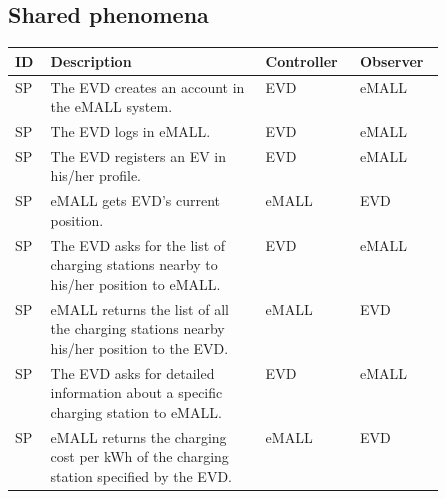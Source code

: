 \subsection{Shared phenomena}
\label{subsec:shared_phenomena}%
\setcounter{sp}{1}
\newcommand{\csp} {\thesp\stepcounter{sp}}
\begin{center}
    \begin{longtable}{ |l|p{0.5\linewidth}|l|l| }
        \hline
        \textbf{ID} & \textbf{Description}                                                                                                          & \textbf{Controller} & \textbf{Observer} \\
        \hline
        SP\csp      & The EVD creates an account in the eMALL system.\                                                                               & EVD                 & eMALL             \\
        \hline
        SP\csp      & The EVD logs in eMALL.                                                                                                        & EVD                 & eMALL             \\
        \hline
        SP\csp      & The EVD registers an EV in his/her profile.\                                                                                   & EVD                 & eMALL             \\
        \hline
        SP\csp      & eMALL gets EVD's current position.\                                                                                            & eMALL               & EVD               \\
        \hline
        SP\csp      & The EVD asks for the list of charging stations nearby to his/her position to eMALL.                                            & EVD                 & eMALL             \\
        \hline
        SP\csp      & eMALL returns the list of all the charging stations nearby his/her position to the EVD.                                        & eMALL               & EVD               \\
        \hline
        SP\csp      & The EVD asks for detailed information about a specific charging station to eMALL.                                              & EVD                 & eMALL             \\
        \hline
        SP\csp      & eMALL returns the charging cost per kWh of the charging station specified by the EVD.                                          & eMALL               & EVD               \\

\end{longtable}
\end{center}
